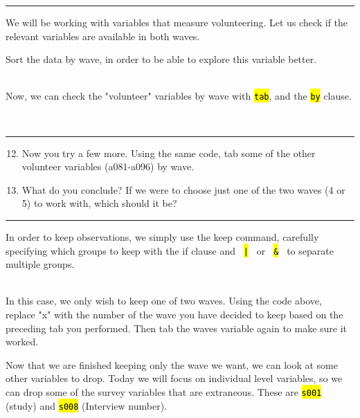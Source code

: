 \documentclass{tufte-handout}
\begin{document}
\bigskip
\hrule
\bigskip

\medskip
We will be working with variables that measure volunteering.  Let us check if the relevant variables are available in both waves.

Sort the data by wave, in order to be able to explore this variable better.\\
\bigskip
{}\\
\bigskip

Now, we can check the "volunteer" variables by wave with {\tt \hl{tab}}, and the {\tt \hl{by}} clause.

\bigskip
{} \\

\bigskip
\hrule
\bigskip

\begin{enumerate}[leftmargin=.5in]
\setcounter{enumi}{11}
	\item Now you try a few more. Using the same code, tab some of the other volunteer variables (a081-a096) by wave.
	\item What do you conclude? If we were to choose just one of the two waves (4 or 5) to work with, which should it be?
\end{enumerate}
\bigskip
\hrule
\bigskip

\medskip

In order to keep observations, we simply use the keep command, carefully specifying which groups to keep with the if clause and {\tt \hl{ | }} or {\tt \hl{ \& }} to separate multiple groups.\\

\bigskip
{} \\
\bigskip

In this case, we only wish to keep one of two waves. Using the code above, replace "x" with the number of the wave you have decided to keep based on the preceding tab you performed. Then tab the waves variable again to make sure it worked.

\medskip
{}
\medskip

Now that we are finished keeping only the wave we want, we can look at some other variables to drop. Today we will focus on individual level variables, so we can drop some of the survey variables that are extraneous. These are {\tt \hl{s001}} (study) and {\tt \hl{s008}} (Interview number).
\end{document}
